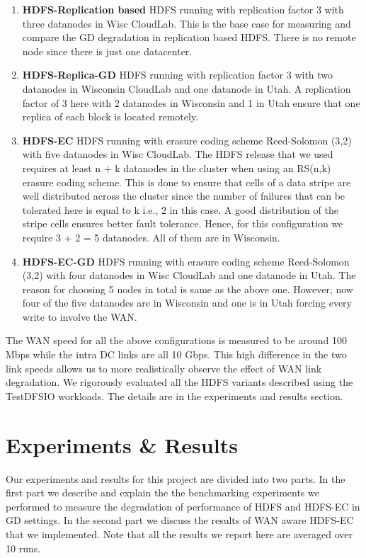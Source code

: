 \documentclass{sig-alternate-05-2015}
\begin{document}
\begin{enumerate}
  \item \textbf{HDFS-Replication based} HDFS running with replication factor 3 with three datanodes in Wisc CloudLab. This is the base case for measuring  and compare the GD degradation in replication based HDFS. There is no remote node since there is just one datacenter.  
	\item \textbf{HDFS-Replica-GD} HDFS running with replication factor 3 with two datanodes in Wisconsin CloudLab and one datanode in Utah. A replication factor of 3 here with 2 datanodes in Wisconsin and 1 in Utah ensure that one replica of each block is located remotely.
	\item \textbf{HDFS-EC} HDFS running with erasure coding scheme Reed-Solomon (3,2) with five datanodes in Wisc CloudLab. The HDFS release that we used\cite{hdfs-ec} requires at least n + k datanodes in the cluster when using an RS(n,k) erasure coding scheme. This is done to ensure that cells of a data stripe are well distributed across the cluster since the number of failures that can be tolerated here is equal to k i.e., 2 in this case. A good distribution of the stripe cells ensures better fault tolerance. Hence, for this configuration we require 3 + 2 = 5 datanodes. All of them are in Wisconsin.
	\item \textbf{HDFS-EC-GD} HDFS running with erasure coding scheme Reed-Solomon (3,2) with four datanodes in Wisc CloudLab and one datanode in Utah. The reason for choosing 5 nodes in total is same as the above one. However, now four of the five datanodes are in Wisconsin and one is in Utah forcing every write to involve the WAN. 
  \end{enumerate}
The WAN speed for all the above configurations is measured to be around 100 Mbps while the intra DC links are all 10 Gbps. This high difference in the two link speeds allows us to more realistically observe the effect of WAN link degradation. We rigorously evaluated all the HDFS variants described using the TestDFSIO workloads. The details are in the experiments and results section. 

\section{Experiments \& Results}

Our experiments and results for this project are divided into two parts. In the first part we describe and explain the the benchmarking experiments we performed to measure the degradation of performance of HDFS and HDFS-EC in GD settings. In the second part we discuss the results of WAN aware HDFS-EC that we implemented. Note that all the results we report here are averaged over 10 runs. %
\end{document}
